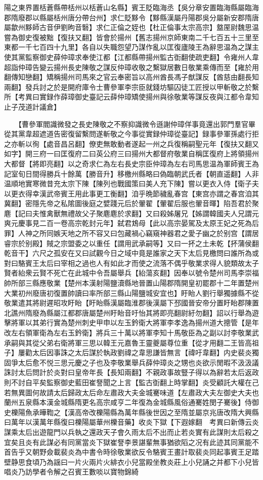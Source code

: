 陽之東界置栝蒼縣帶栝州以栝蒼山名縣】賓王貶臨海丞【吳分章安置臨海縣屬臨海郡隋廢郡以縣屬栝州唐分帶台州】求仁貶黟令【黟縣漢屬丹陽郡吳分屬新安郡隋唐屬歙州黟師古音伊劉昫音䃜】求仁正倫之姪也【杜正倫事太宗高宗】盩厔尉魏思温嘗為御史復被黜【復扶又翻】皆會於揚州【舊志揚州京師東南二千七百五十三里至東都一千七百四十九里】各自以失職怨望乃謀作亂以匡復廬陵王為辭思温為之謀主使其黨監察御史薛仲璋求奉使江都【江都縣帶揚州監古衘翻使疏吏翻】令雍州人韋超詣仲璋告變云揚州長史陳敬之謀反仲璋收敬之繫獄居數日敬業乘傳而至【雍於用翻傳知戀翻】矯稱揚州司馬來之官云奉密旨以高州酋長馮子猷謀反【酋慈由翻長知兩翻】發兵討之於是開府庫令士曹參軍李宗臣就錢坊驅囚徒工匠授以甲斬敬之於繫所【考異曰實録作薛璋御史臺記云薛仲璋矯使揚州與徐敬業等謀反夜與江都令韋知止子茂道計議倉】

　　【曹參軍閻識微發之長史陳敬之不察抑識微令遜謝仲璋佯事竟還出郭門羣官畢從其黨韋超遮道告密復留繫問遂斬敬之今事從實録仲璋從臺記】録事參軍孫處行拒之亦斬以徇【處音昌呂翻】僚吏無敢動者遂起一州之兵復稱嗣聖元年【復扶又翻又如字】開三府一曰匡復府二曰英公府三曰揚州大都督府敬業自稱匡復府上將領揚州大都督【將即亮翻】以之奇求仁為左右長史宗臣仲璋為左右司馬思温為軍師賓王為記室旬日間得勝兵十餘萬【勝音升】移檄州縣略曰偽臨朝武氏者【朝直遥翻】人非温順地實寒微昔充太宗下陳【陳列也戰國策曰美人充下陳】嘗以更衣入侍【衛子夫以更衣得幸漢武帝賓王用此事更工衡翻】洎乎晩節穢亂春宫【東宫亦謂之春宫洎其冀翻】密隱先帝之私隂圖後庭之嬖踐元后於翬翟【翬翟后服也翬音暉】陷吾君於聚麀【記曰夫惟禽獸無禮故父子聚麀麀於求翻】又曰殺姊屠兄【姊謂韓國夫人兄謂元爽元慶事見二百一卷高宗乾封元年】弑君鴆母【此以高宗晏駕及太原王妃之死為后罪】人神之所同嫉天地之所不容又曰包藏禍心竊窺神器君之愛子幽之於别宫【謂居睿宗於别殿】賊之宗盟委之以重任【謂用武承嗣等】又曰一抔之土未乾【抔蒲侯翻乾音干】六尺之孤安在又曰試觀今日之域中竟是誰家之天下太后見檄問曰誰所為或對曰駱賓王太后曰宰相之過也人有如此才而使之流落不偶乎敬業求得人貌類故太子賢者紿衆云賢不死亡在此城中令吾屬舉兵【紿蕩亥翻】因奉以號令楚州司馬李崇福帥所部三縣應敬業【楚州本漢射陽鹽瀆縣地晉置山陽郡隋開皇初罷郡十二年置楚州大業初州廢唐初復置帥讀曰率所部三縣山陽鹽城安宜也】盱眙人劉行舉獨據縣不從敬業遣其將尉遲昭攻盱眙【盱眙縣漢屬臨淮郡後漢屬下邳國晉安帝分置盱眙郡陳置北譙州隋廢為縣屬江都郡唐屬楚州盱眙音吁怡其將即亮翻尉紆勿翻】詔以行舉為遊擊將軍以其弟行實為楚州刺史甲申以左玉鈐衛大將軍李孝逸為揚州道大摠管【是年改左右領軍衛為左右玉鈐衛】將兵三十萬以將軍李知十馬敬臣為之副以討李敬業武承嗣與其從父弟右衛將軍三思以韓王元嘉魯王靈夔屬尊位重【從才用翻二王皆高祖子】屢勸太后因事誅之太后謀於執政劉禕之韋思謙皆無言【禕吁韋翻】内史裴炎獨固爭太后愈不悦三思元慶之子也及李敬業舉兵薛仲璋炎之甥也炎欲示閒暇不汲汲議誅討太后問計於炎對曰皇帝年長【長知兩翻】不親政事故豎子得以為辭若太后返政則不討自平矣監察御史藍田崔詧聞之上言【監古衘翻上時掌翻】炎受顧託大權在己若無異圖何故請太后歸政太后命左肅政大夫金城騫味道【左肅政大夫左御史大夫也蘭州五泉縣本漢金城縣隋更名高宗咸亨二年復為金城縣風俗通騫姓閔子騫後】侍御史櫟陽魚承曄鞫之【漢高帝改櫟陽縣為萬年縣後世因之至隋並屬京兆唐改隋大興縣曰萬年以漢萬年縣復曰櫟陽屬華州櫟音藥】收炎下獄【下遐嫁翻　考異曰新傳云炎謀乘太后出遊龍門以兵執之還政天子會久雨太后不出而止若炎實有此謀則太后殺之宜矣且炎有此謀必有同黨當炎下獄崔詧李景諶輩無事猶欲䧟之况有此迹其同黨能不首告乎又朝野僉載裴炎為中書令時徐敬業欲反令駱賓王畫計取裴炎同起事賓王足踏壁静思食頃乃為謡曰一片火兩片火緋衣小兒當殿坐教炎莊上小兒誦之并都下小兒皆唱炎乃訪學者令解之召賓王數啖以寶物錦綺